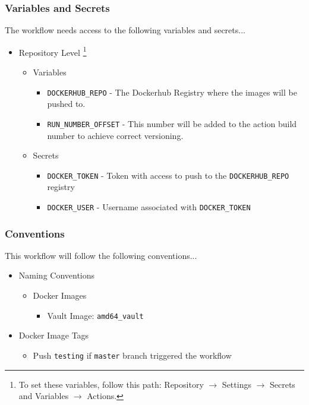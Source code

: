 \documentclass[a4paper,11pt]{article}
\begin{document}
\subsubsection{Variables and Secrets}
The workflow needs access to the following variables and secrets...
\begin{itemize}
    \item Repository Level \footnote{To set these variables, follow this path: Repository $\rightarrow$ Settings $\rightarrow$ Secrets and Variables $\rightarrow$ Actions.}
    \begin{itemize}
        \item Variables
        \begin{itemize}
            \item\verb|DOCKERHUB_REPO| - The Dockerhub Registry where the images will be pushed to.
            \item\verb|RUN_NUMBER_OFFSET| - This number will be added to the action build number to achieve correct versioning.
        \end{itemize}
        \item Secrets
        \begin{itemize}
            \item\verb|DOCKER_TOKEN| - Token with access to push to the \verb|DOCKERHUB_REPO| registry
            \item\verb|DOCKER_USER| - Username associated with \verb|DOCKER_TOKEN|
        \end{itemize}
    \end{itemize}
\end{itemize}

\subsubsection{Conventions}
This workflow will follow the following conventions...
\begin{itemize}
    \item Naming Conventions
    \begin{itemize}
        \item Docker Images
        \begin{itemize}
            \item Vault Image: \verb|amd64_vault|
        \end{itemize}
    \end{itemize}
    \item{Docker Image Tags}
    \begin{itemize}
        \item Push \verb|testing| if \verb|master| branch triggered the workflow
    \end{itemize}
\end{itemize}
\end{document}
